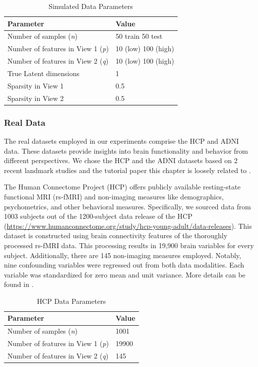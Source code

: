 \begin{table}[h]
\centering
\caption{Simulated Data Parameters}
\begin{tabular}{| l | l |}
\hline
\textbf{Parameter} & \textbf{Value} \\
\hline
Number of samples (\textit{n}) & 50 train 50 test \\
Number of features in View 1 (\textit{p}) & 10 (low) 100 (high) \\
Number of features in View 2 (\textit{q}) & 10 (low) 100 (high) \\
True Latent dimensions & 1 \\
Sparsity in View 1 & 0.5 \\
Sparsity in View 2 & 0.5 \\
\hline
\end{tabular}
\end{table}

\subsubsection{Real Data}

The real datasets employed in our experiments comprise the HCP and ADNI data.
These datasets provide insights into brain functionality and behavior from different perspectives.
We chose the HCP and the ADNI datasets based on 2 recent landmark studies and the tutorial paper this chapter is loosely related to \citep{mihalik2022canonical}.

The Human Connectome Project (HCP) offers publicly available resting-state functional MRI (rs-fMRI) and non-imaging measures like demographics, psychometrics, and other behavioral measures.
Specifically, we sourced data from 1003 subjects out of the 1200-subject data release of the HCP (\url{https://www.humanconnectome.org/study/hcp-young-adult/data-releases}). This dataset is constructed using brain connectivity features of the thoroughly processed rs-fMRI data.
This processing results in 19,900 brain variables for every subject.
Additionally, there are 145 non-imaging measures employed.
Notably, nine confounding variables were regressed out from both data modalities.
Each variable was standardized for zero mean and unit variance.
More details can be found in \citep{smith2015positive, mihalik2022canonical}.

\begin{table}[h]
\centering
\caption{HCP Data Parameters}
\begin{tabular}{| l | l |}
\hline
\textbf{Parameter} & \textbf{Value} \\
\hline
Number of samples (\textit{n}) & 1001 \\
Number of features in View 1 (\textit{p}) & 19900 \\
Number of features in View 2 (\textit{q}) & 145 \\
\hline
\end{tabular}
\label{table:hcp-parameters}
\end{table}

